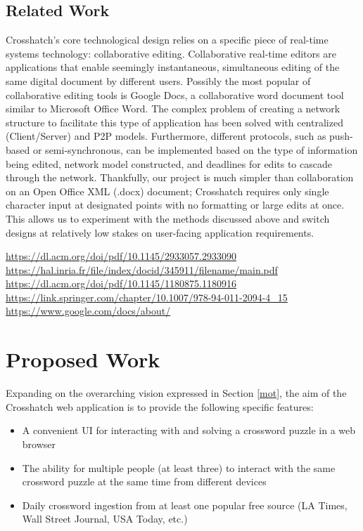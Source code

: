 \documentclass{article}
\begin{document}
\subsection{Related Work}
Crosshatch's core technological design relies on a specific piece of real-time systems technology: collaborative editing.
Collaborative real-time editors are applications that enable seemingly instantaneous, simultaneous editing 
of the same digital document by different users.
Possibly the most popular of collaborative editing tools is Google Docs, a collaborative
word document tool similar to Microsoft Office Word.
The complex problem of creating a network structure to facilitate this type of application has been solved with centralized (Client/Server)
and P2P models.
Furthermore, different protocols, such as push-based or semi-synchronous, can be implemented based on the type of information being edited,
network model constructed, and deadlines for edits to cascade through the network.
Thankfully, our project is much simpler than collaboration on an Open Office XML (.docx) document; Crosshatch requires only
single character input at designated points with no formatting or large edits at once. 
This allows us to experiment with the methods discussed above and switch designs 
at relatively low stakes on user-facing application requirements. 

\noindent
\url{https://dl.acm.org/doi/pdf/10.1145/2933057.2933090} \\
\url{https://hal.inria.fr/file/index/docid/345911/filename/main.pdf} \\
\url{https://dl.acm.org/doi/pdf/10.1145/1180875.1180916} \\
\url{https://link.springer.com/chapter/10.1007/978-94-011-2094-4\_15} \\
\url{https://www.google.com/docs/about/}

\section{Proposed Work}
Expanding on the overarching vision expressed in Section \ref{mot}, the aim of the Crosshatch web application is to provide the following
specific features:
\begin{itemize}
  \item A convenient UI for interacting with and solving a crossword puzzle in a web browser
  \item The ability for multiple people (at least three) to interact with the same crossword puzzle at the same time from different devices
  \item Daily crossword ingestion from at least one popular free source (LA Times, Wall Street Journal, USA Today, etc.)
\end{itemize}
\end{document}
